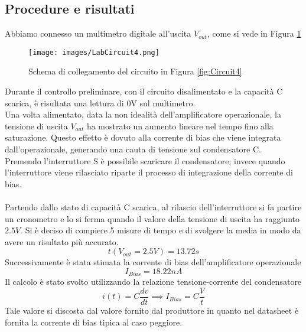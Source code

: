 \subsection{Procedure e risultati}
Abbiamo connesso un multimetro digitale all'uscita $V_{out}$, come si vede in Figura \ref{fig:LabCircuit4}
\begin{figure}[H]
    \centering
    \texttt{[image: images/LabCircuit4.png]}
    \caption{Schema di collegamento del circuito in Figura \ref{fig:Circuit4}}
    \label{fig:LabCircuit4}
\end{figure}
Durante il controllo preliminare, con il circuito disalimentato e la capacità C scarica, è risultata una lettura di 0V sul multimetro.\\ 
Una volta alimentato, data la non idealità dell'amplificatore operazionale, la tensione di uscita $V_{out}$ ha mostrato un aumento lineare nel tempo fino alla saturazione. Questo effetto è dovuto alla corrente di bias che viene integrata dall'operazionale, generando una cauta di tensione sul condensatore C.\\
Premendo l'interruttore S è possibile scaricare il condensatore; invece quando l'interruttore viene rilasciato riparte il processo di integrazione della corrente di bias.\\\\
Partendo dallo stato di capacità C scarica, al rilascio dell'interruttore si fa partire un cronometro e lo si ferma quando il valore della tensione di uscita ha raggiunto $2.5V$.
Si è deciso di compiere 5 misure di tempo e di svolgere la media in modo da avere un risultato più accurato.
\begin{equation}
    t(V_{out}=2.5V)=13.72s
\end{equation}
Successivamente è stata stimata la corrente di bias dell'amplificatore operazionale
\begin{equation}
    I_{Bias}=18.22nA
\end{equation}
Il calcolo è stato svolto utilizzando la relazione tensione-corrente del condensatore 
\begin{equation}
    i(t)=C\frac{dv}{dt}\implies I_{Bias}=C\frac{V}{t}
\end{equation}
Tale valore si discosta dal valore fornito dal produttore in quanto nel datasheet è fornita la corrente di bias tipica al caso peggiore.
\clearpage
